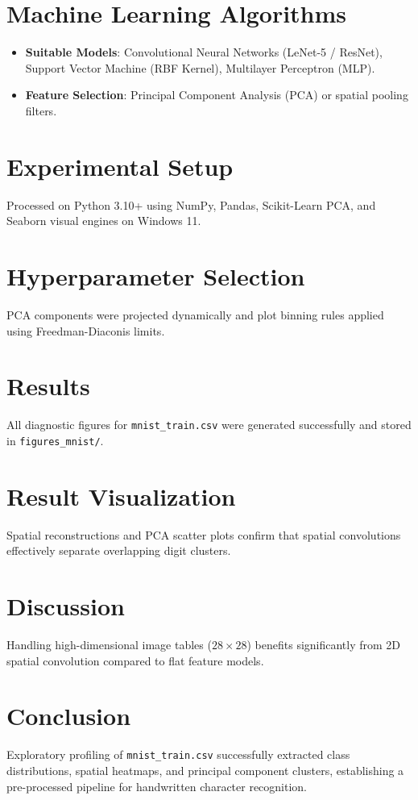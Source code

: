 \documentclass[12pt,a4paper]{article}
\begin{document}
\section{Machine Learning Algorithms}
\begin{itemize}[noitemsep]
    \item \textbf{Suitable Models}: Convolutional Neural Networks (LeNet-5 / ResNet), Support Vector Machine (RBF Kernel), Multilayer Perceptron (MLP).
    \item \textbf{Feature Selection}: Principal Component Analysis (PCA) or spatial pooling filters.
\end{itemize}

\section{Experimental Setup}
Processed on Python 3.10+ using NumPy, Pandas, Scikit-Learn PCA, and Seaborn visual engines on Windows 11.

\section{Hyperparameter Selection}
PCA components were projected dynamically and plot binning rules applied using Freedman-Diaconis limits.

\section{Results}
All diagnostic figures for \texttt{mnist\_train.csv} were generated successfully and stored in \texttt{figures\_mnist/}.

\section{Result Visualization}
Spatial reconstructions and PCA scatter plots confirm that spatial convolutions effectively separate overlapping digit clusters.

\section{Discussion}
Handling high-dimensional image tables ($28 \times 28$) benefits significantly from 2D spatial convolution compared to flat feature models.

\section{Conclusion}
Exploratory profiling of \texttt{mnist\_train.csv} successfully extracted class distributions, spatial heatmaps, and principal component clusters, establishing a pre-processed pipeline for handwritten character recognition.
\end{document}
